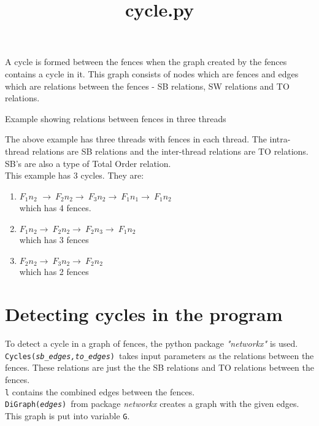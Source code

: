 \documentclass[dvipsnames]{article}
\date{}
\newcommand{\var}[1]{\color{OliveGreen} \texttt{#1}\color{black}}
\newcommand{\fun}[2]{\color{Sepia}\texttt{#1(\color{Gray}\textit{#2}\color{Sepia})}\color{black}}
\begin{document}
\title{cycle.py}
\maketitle

A cycle is formed between the fences when the graph created by the fences contains a cycle in it. This graph consists of nodes which are fences and edges which are relations between the fences - SB relations, SW relations and TO relations.\\
\begin{center}
    
    Example showing relations between fences in three threads
\end{center}
The above example has three threads with fences in each thread. The intra-thread relations are SB relations and the inter-thread relations are TO relations. SB's are also a type of Total Order relation. \\

This example has 3 cycles. They are:\\
\begin{enumerate}
    \item $F_1n_2$ $\rightarrow\ F_2n_2 \rightarrow\ F_3n_2 \rightarrow\ F_1n_1 \rightarrow\ F_1n_2$\\which has 4 fences.
    
    \item $F_1n_2 \rightarrow\ F_2n_2 \rightarrow\ F_2n_3 \rightarrow\ F_1n_2$\\which has 3 fences
    \item $F_2n_2 \rightarrow\ F_3n_2 \rightarrow\ F_2n_2$\\which has 2 fences
\end{enumerate}

\section{Detecting cycles in the program}
To detect a cycle in a graph of fences, the python package \textit{"networkx"} is used.\\

\fun{Cycles}{sb\_edges,to\_edges}\ takes input parameters as the relations between the fences. These relations are just the the SB relations and TO relations between the fences.\\

\var{l} contains the combined edges between the fences.\\

\fun{DiGraph}{edges}\ from package \textit{networkx} creates a graph with the given edges. This graph is put into variable \var{G}.\\
\end{document}
